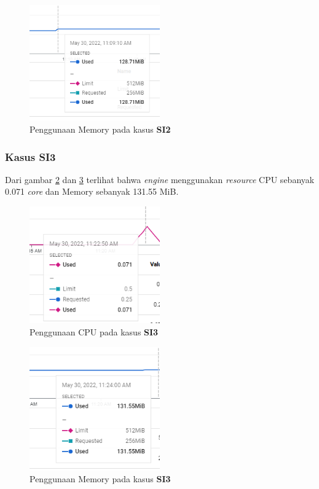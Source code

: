 \begin{figure}[!htb]
	\centering
	\includegraphics[width=0.5\textwidth]{resources/ch4/resource/2-mem.png}
	\caption{Penggunaan Memory pada kasus \textbf{SI2}}
	\label{result_mem_2}
\end{figure}

\pagebreak

\subsubsection{Kasus SI3}
Dari gambar \ref{result_cpu_3} dan \ref{result_mem_3} terlihat bahwa \textit{engine} menggunakan \textit{resource} CPU sebanyak 0.071 \textit{core} dan Memory sebanyak 131.55 MiB. 

\begin{figure}[!htb]
	\centering
	\includegraphics[width=0.5\textwidth]{resources/ch4/resource/3-cpu.png}
	\caption{Penggunaan CPU pada kasus \textbf{SI3}}
	\label{result_cpu_3}
\end{figure}

\begin{figure}[!htb]
	\centering
	\includegraphics[width=0.5\textwidth]{resources/ch4/resource/3-mem.png}
	\caption{Penggunaan Memory pada kasus \textbf{SI3}}
	\label{result_mem_3}
\end{figure}

